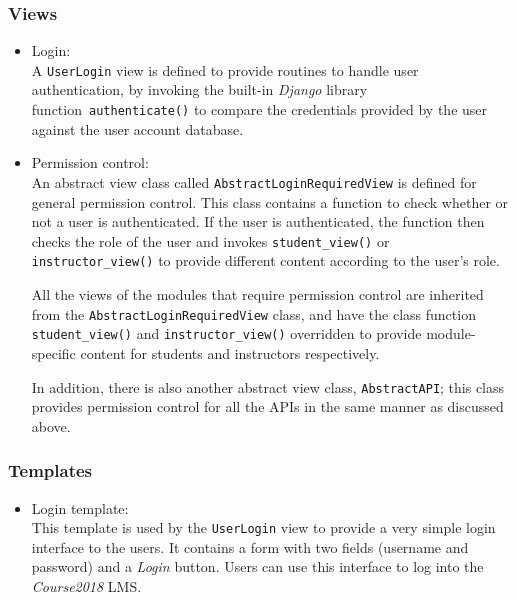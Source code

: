 \subsubsection{Views}

\begin{itemize}
    \item Login: \\
        A \texttt{UserLogin} view is defined to provide routines to handle user
        authentication, by invoking the built-in \emph{Django} library
        function~\texttt{authenticate()}
        to compare the credentials provided
        by the user against the user account database.

    \item Permission control: \\
        An abstract view class called \texttt{AbstractLoginRequiredView} is
        defined for general permission control. This class contains a function
        to check whether or not a user is authenticated. If the user is
        authenticated, the function then checks the role of the user and
        invokes \texttt{student\_view()} or \texttt{instructor\_view()} to
        provide different content according to the user's role.

        All the views of the modules that require permission control are
        inherited from the \texttt{AbstractLoginRequiredView} class, and have
        the class function \texttt{student\_\-view()} and
        \texttt{instructor\_view()} overridden to provide module-specific
        content for students and instructors respectively.

        In addition, there is also another abstract view class,
        \texttt{AbstractAPI}; this class provides permission
        control for all the APIs in the same manner as discussed above.
\end{itemize}

\subsubsection{Templates}

\begin{itemize}
    \item Login template: \\
        This template is used by the \texttt{UserLogin} view to provide a very
        simple login interface to the users. It contains a form with two
        fields (username and password) and a \emph{Login} button. Users can
        use this interface to log into the \emph{Course2018} LMS.
\end{itemize}


